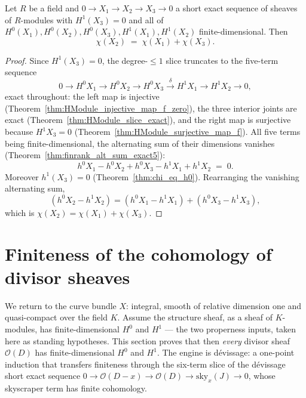 \begin{theorem}
  \label{thm:chi_eq_add_of_shortExact}
  \leanok
  Let \(R\) be a field and \(0 \to X_1 \to X_2 \to X_3 \to 0\) a short exact sequence of sheaves
  of \(R\)-modules with \(H^1(X_3) = 0\) and all of \(H^0(X_1), H^0(X_2), H^0(X_3), H^1(X_1),
  H^1(X_2)\) finite-dimensional. Then
  \[
    \chi(X_2) \;=\; \chi(X_1) + \chi(X_3).
  \]
\end{theorem}
\begin{proof}
  \leanok
  Since \(H^1(X_3) = 0\), the degree-\(\le 1\) slice truncates to the five-term sequence
  \[
    0 \to H^0 X_1 \to H^0 X_2 \to H^0 X_3 \xrightarrow{\delta}
      H^1 X_1 \to H^1 X_2 \to 0,
  \]
  exact throughout: the left map is injective (Theorem~\ref{thm:HModule_injective_map_f_zero}),
  the three interior joints are exact (Theorem~\ref{thm:HModule_slice_exact}), and the right map
  is surjective because \(H^1 X_3 = 0\) (Theorem~\ref{thm:HModule_surjective_map_f}). All five
  terms being finite-dimensional, the alternating sum of their dimensions vanishes
  (Theorem~\ref{thm:finrank_alt_sum_exact5}):
  \[
    h^0 X_1 - h^0 X_2 + h^0 X_3 - h^1 X_1 + h^1 X_2 \;=\; 0 .
  \]
  Moreover \(h^1(X_3) = 0\) (Theorem~\ref{thm:chi_eq_h0}). Rearranging the vanishing alternating
  sum,
  \[
    (h^0 X_2 - h^1 X_2) = (h^0 X_1 - h^1 X_1) + (h^0 X_3 - h^1 X_3),
  \]
  which is \(\chi(X_2) = \chi(X_1) + \chi(X_3)\).
\end{proof}

\section{Finiteness of the cohomology of divisor sheaves}

We return to the curve bundle \(X\): integral, smooth of relative dimension one and quasi-compact
over the field \(K\). Assume the structure sheaf, as a sheaf of \(K\)-modules, has
finite-dimensional \(H^0\) and \(H^1\) --- the two properness inputs, taken here as standing
hypotheses. This section proves that then \emph{every} divisor sheaf \(\mathcal O(D)\) has
finite-dimensional \(H^0\) and \(H^1\). The engine is dévissage: a one-point induction that
transfers finiteness through the six-term slice of the dévissage short exact sequence
\(0 \to \mathcal O(D-x) \to \mathcal O(D) \to \mathrm{sky}_x(J) \to 0\), whose skyscraper term
has finite cohomology.


